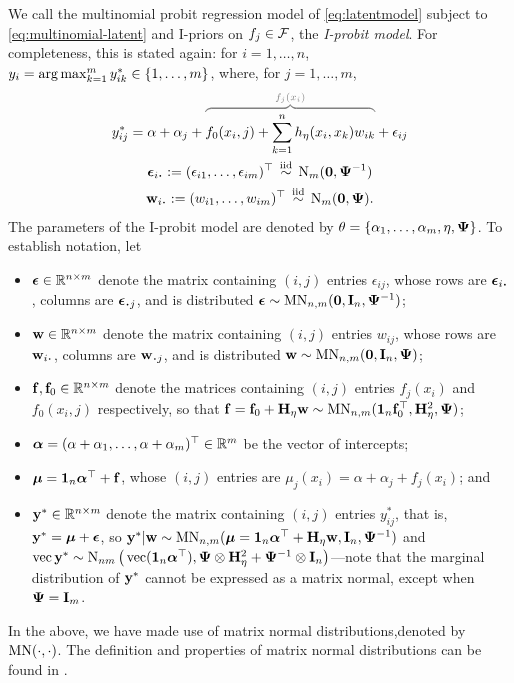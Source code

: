 We call the multinomial probit regression model of \cref{eq:latentmodel} subject to \cref{eq:multinomial-latent} and I-priors on $f_j \in {\mathcal F}$, the \emph{I-probit model}.
For completeness, this is stated again: for $i=1,\dots,n$, $y_i = \operatorname*{arg\,max}_{k=1}^m y_{ik}^* \in \{1,\dots,m\}$, where, for $j=1,\dots,m$,
\begin{align}\label{eq:iprobitmod}
  \begin{gathered}
    y_{ij}^* = \alpha + \alpha_j + 
    \greyoverbrace{f_0(x_i, j) + \sum_{k=1}^n h_\eta(x_i,x_k)w_{ik}}{f_j(x_i)}
    + \epsilon_{ij} \\
    \bepsilon_{i \bigcdot} := (\epsilon_{i1}, \dots, \epsilon_{im})^\top  \iid \N_m(\bzero, \bPsi^{-1}) \\
    \bw_{i \bigcdot} := (w_{i1},\dots,w_{im})^\top \iid \N_m(\bzero,\bPsi).
  \end{gathered}
\end{align}
The parameters of the I-probit model are denoted by $\theta = \{\alpha_1,\dots,\alpha_m,\eta,{\bm\Psi} \}$.
To establish notation, let 
\begin{itemize}
  \item ${\bm\epsilon} \in \mathbb{R}^{n \times m}$ denote the matrix containing $(i,j)$ entries $\epsilon_{ij}$, whose rows are $\bepsilon_{i \bigcdot}$, columns are $\bepsilon_{\bigcdot j}$, and is distributed ${\bm\epsilon} \sim \operatorname{MN}_{n,m}({\mathbf 0}, {\mathbf I}_n,{\bm\Psi}^{-1})$;
  \item ${\mathbf w} \in \mathbb{R}^{n \times m}$ denote the matrix containing $(i,j)$ entries $w_{ij}$, whose rows are $\bw_{i \bigcdot}$, columns are $\bw_{\bigcdot j}$, and is distributed ${\mathbf w} \sim \operatorname{MN}_{n,m}({\mathbf 0}, {\mathbf I}_n,{\bm\Psi})$;
  \item ${\mathbf f},{\mathbf f}_0 \in \mathbb{R}^{n \times m}$ denote the matrices containing $(i,j)$ entries $f_j(x_i)$ and $f_0(x_i,j)$ respectively, so that ${\mathbf f} = {\mathbf f}_0 + {\mathbf H}_\eta{\mathbf w} \sim \operatorname{MN}_{n,m}({\mathbf 1}_n{\mathbf f}_0^\top, {\mathbf H}_\eta^2, {\bm\Psi})$;
  \item ${\bm\alpha} = (\alpha + \alpha_1,\dots,\alpha + \alpha_m)^\top\in\mathbb{R}^{m}$ be the vector of intercepts;
  \item ${\bm\mu} = {\mathbf 1}_n{\bm\alpha}^\top + {\mathbf f}$, whose $(i,j)$ entries are $\mu_{j}(x_i) = \alpha + \alpha_j + f_j(x_i)$; and
  \item ${\mathbf y}^* \in \mathbb{R}^{n \times m}$ denote the matrix containing $(i,j)$ entries $y_{ij}^*$, that is, ${\mathbf y}^* = {\bm\mu} + {\bm\epsilon}$, so ${\mathbf y}^*|{\mathbf w} \sim \operatorname{MN}_{n,m}({\bm\mu} = {\mathbf 1}_n{\bm\alpha}^\top + {\mathbf H}_\eta{\mathbf w}, {\mathbf I}_n, {\bm\Psi}^{-1})$ and $\operatorname{vec} {\mathbf y}^* \sim \operatorname{N}_{nm}\big(\operatorname{vec} ({\mathbf 1}_n{\bm\alpha}^\top), {\bm\Psi} \otimes {\mathbf H}_\eta^2 + {\bm\Psi}^{-1} \otimes {\mathbf I}_n\big)$---note that the marginal distribution of ${\mathbf y}^*$ cannot be expressed as a matrix normal, except when ${\bm\Psi}={\mathbf I}_m$.
\end{itemize}
In the above, we have made use of matrix normal distributions,denoted by $\operatorname{MN}(\cdot,\cdot)$.
The definition and properties of matrix normal distributions can be found in .

